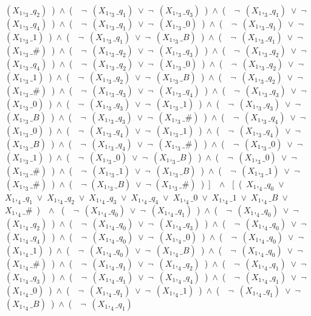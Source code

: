 ﻿\documentclass[a4paper,10pt]{article}
\begin{document}
$(X_1,_3\_q_2)$\ )\ $\wedge$\ (\ \ $\neg$\ $(X_1,_3\_q_1)$\ $\vee$\ $\neg$\ $(X_1,_3\_q_3)$\ )\ $\wedge$\ (\ \ $\neg$\ $(X_1,_3\_q_1)$\ $\vee$\ $\neg$\ $(X_1,_3\_q_4)$\ )\ $\wedge$\ (\ \ $\neg$\ $(X_1,_3\_q_1)$\ $\vee$\ $\neg$\ $(X_1,_3\_0)$\ )\ $\wedge$\ (\ \ $\neg$\ $(X_1,_3\_q_1)$\ $\vee$\ $\neg$\ $(X_1,_3\_1)$\ )\ $\wedge$\ (\ \ $\neg$\ $(X_1,_3\_q_1)$\ $\vee$\ $\neg$\ $(X_1,_3\_B)$\ )\ $\wedge$\ (\ \ $\neg$\ $(X_1,_3\_q_1)$\ $\vee$\ $\neg$\ $(X_1,_3\_\#)$\ )\ $\wedge$\ (\ \ $\neg$\ $(X_1,_3\_q_2)$\ $\vee$\ $\neg$\ $(X_1,_3\_q_3)$\ )\ $\wedge$\ (\ \ $\neg$\ $(X_1,_3\_q_2)$\ $\vee$\ $\neg$\ $(X_1,_3\_q_4)$\ )\ $\wedge$\ (\ \ $\neg$\ $(X_1,_3\_q_2)$\ $\vee$\ $\neg$\ $(X_1,_3\_0)$\ )\ $\wedge$\ (\ \ $\neg$\ $(X_1,_3\_q_2)$\ $\vee$\ $\neg$\ $(X_1,_3\_1)$\ )\ $\wedge$\ (\ \ $\neg$\ $(X_1,_3\_q_2)$\ $\vee$\ $\neg$\ $(X_1,_3\_B)$\ )\ $\wedge$\ (\ \ $\neg$\ $(X_1,_3\_q_2)$\ $\vee$\ $\neg$\ $(X_1,_3\_\#)$\ )\ $\wedge$\ (\ \ $\neg$\ $(X_1,_3\_q_3)$\ $\vee$\ $\neg$\ $(X_1,_3\_q_4)$\ )\ $\wedge$\ (\ \ $\neg$\ $(X_1,_3\_q_3)$\ $\vee$\ $\neg$\ $(X_1,_3\_0)$\ )\ $\wedge$\ (\ \ $\neg$\ $(X_1,_3\_q_3)$\ $\vee$\ $\neg$\ $(X_1,_3\_1)$\ )\ $\wedge$\ (\ \ $\neg$\ $(X_1,_3\_q_3)$\ $\vee$\ $\neg$\ $(X_1,_3\_B)$\ )\ $\wedge$\ (\ \ $\neg$\ $(X_1,_3\_q_3)$\ $\vee$\ $\neg$\ $(X_1,_3\_\#)$\ )\ $\wedge$\ (\ \ $\neg$\ $(X_1,_3\_q_4)$\ $\vee$\ $\neg$\ $(X_1,_3\_0)$\ )\ $\wedge$\ (\ \ $\neg$\ $(X_1,_3\_q_4)$\ $\vee$\ $\neg$\ $(X_1,_3\_1)$\ )\ $\wedge$\ (\ \ $\neg$\ $(X_1,_3\_q_4)$\ $\vee$\ $\neg$\ $(X_1,_3\_B)$\ )\ $\wedge$\ (\ \ $\neg$\ $(X_1,_3\_q_4)$\ $\vee$\ $\neg$\ $(X_1,_3\_\#)$\ )\ $\wedge$\ (\ \ $\neg$\ $(X_1,_3\_0)$\ $\vee$\ $\neg$\ $(X_1,_3\_1)$\ )\ $\wedge$\ (\ \ $\neg$\ $(X_1,_3\_0)$\ $\vee$\ $\neg$\ $(X_1,_3\_B)$\ )\ $\wedge$\ (\ \ $\neg$\ $(X_1,_3\_0)$\ $\vee$\ $\neg$\ $(X_1,_3\_\#)$\ )\ $\wedge$\ (\ \ $\neg$\ $(X_1,_3\_1)$\ $\vee$\ $\neg$\ $(X_1,_3\_B)$\ )\ $\wedge$\ (\ \ $\neg$\ $(X_1,_3\_1)$\ $\vee$\ $\neg$\ $(X_1,_3\_\#)$\ )\ $\wedge$\ (\ \ $\neg$ $(X_1,_3\_B)$\ $\vee$\ $\neg$ $(X_1,_3\_\#)$\ )\ ]\ \ $\wedge$ \ [\ (\ $X_1,_4\_q_0$\ $\vee$\ $X_1,_4\_q_1$\ $\vee$\ $X_1,_4\_q_2$\ $\vee$\ $X_1,_4\_q_3$\ $\vee$\ $X_1,_4\_q_4$\ $\vee$\ $X_1,_4\_0$\ $\vee$\ $X_1,_4\_1$\ $\vee$\ $X_1,_4\_B$\ $\vee$\ $X_1,_4\_\#$\ )\ \ $\wedge$ \ (\ \ $\neg$\ $(X_1,_4\_q_0)$\ $\vee$\ $\neg$\ $(X_1,_4\_q_1)$\ )\ $\wedge$\ (\ \ $\neg$\ $(X_1,_4\_q_0)$\ $\vee$\ $\neg$\ $(X_1,_4\_q_2)$\ )\ $\wedge$\ (\ \ $\neg$\ $(X_1,_4\_q_0)$\ $\vee$\ $\neg$\ $(X_1,_4\_q_3)$\ )\ $\wedge$\ (\ \ $\neg$\ $(X_1,_4\_q_0)$\ $\vee$\ $\neg$\ $(X_1,_4\_q_4)$\ )\ $\wedge$\ (\ \ $\neg$\ $(X_1,_4\_q_0)$\ $\vee$\ $\neg$\ $(X_1,_4\_0)$\ )\ $\wedge$\ (\ \ $\neg$\ $(X_1,_4\_q_0)$\ $\vee$\ $\neg$\ $(X_1,_4\_1)$\ )\ $\wedge$\ (\ \ $\neg$\ $(X_1,_4\_q_0)$\ $\vee$\ $\neg$\ $(X_1,_4\_B)$\ )\ $\wedge$\ (\ \ $\neg$\ $(X_1,_4\_q_0)$\ $\vee$\ $\neg$\ $(X_1,_4\_\#)$\ )\ $\wedge$\ (\ \ $\neg$\ $(X_1,_4\_q_1)$\ $\vee$\ $\neg$\ $(X_1,_4\_q_2)$\ )\ $\wedge$\ (\ \ $\neg$\ $(X_1,_4\_q_1)$\ $\vee$\ $\neg$\ $(X_1,_4\_q_3)$\ )\ $\wedge$\ (\ \ $\neg$\ $(X_1,_4\_q_1)$\ $\vee$\ $\neg$\ $(X_1,_4\_q_4)$\ )\ $\wedge$\ (\ \ $\neg$\ $(X_1,_4\_q_1)$\ $\vee$\ $\neg$\ $(X_1,_4\_0)$\ )\ $\wedge$\ (\ \ $\neg$\ $(X_1,_4\_q_1)$\ $\vee$\ $\neg$\ $(X_1,_4\_1)$\ )\ $\wedge$\ (\ \ $\neg$\ $(X_1,_4\_q_1)$\ $\vee$\ $\neg$\ $(X_1,_4\_B)$\ )\ $\wedge$\ (\ \ $\neg$\ $(X_1,_4\_q_1)$\ 
\end{document}
